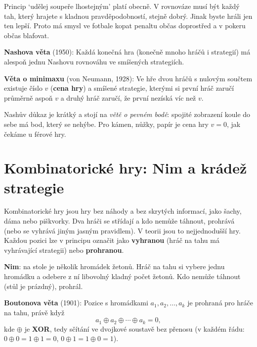 Princip `udělej soupeře lhostejným' platí obecně. V rovnováze musí být každý tah, který hrajete s kladnou pravděpodobností, stejně dobrý. Jinak byste hráli jen ten lepší. Proto má smysl ve fotbale kopat penaltu občas doprostřed a v pokeru občas blafovat.

\begin{definitionbox}
  \textbf{Nashova věta} (1950): Každá konečná hra (konečně mnoho hráčů i strategií) má alespoň jednu Nashovu rovnováhu ve smíšených strategiích.

  \textbf{Věta o minimaxu} (von Neumann, 1928): Ve hře dvou hráčů s nulovým součtem existuje číslo $v$ (\textbf{cena hry}) a smíšené strategie, kterými si první hráč zaručí průměrně aspoň $v$ a druhý hráč zaručí, že první nezíská víc než $v$.
\end{definitionbox}

Nashův důkaz je krátký a stojí na \textit{větě o pevném bodě}: spojité zobrazení koule do sebe má bod, který se nehýbe. Pro kámen, nůžky, papír je cena hry $v = 0$, jak čekáme u férové hry.

\section{Kombinatorické hry: Nim a krádež strategie}

Kombinatorické hry jsou hry bez náhody a bez skrytých informací, jako šachy, dáma nebo piškvorky. Dva hráči se střídají a kdo nemůže táhnout, prohrává (nebo se vyhrává jiným jasným pravidlem). V teorii jsou to nejjednodušší hry. Každou pozici lze v principu označit jako \textbf{vyhranou} (hráč na tahu má vyhrávající strategii) nebo \textbf{prohranou}.

\begin{definitionbox}
  \textbf{Nim}: na stole je několik hromádek žetonů. Hráč na tahu si vybere jednu hromádku a odebere z ní libovolný kladný počet žetonů. Kdo nemůže táhnout (stůl je prázdný), prohrál.

  \textbf{Boutonova věta} (1901): Pozice s hromádkami $a_1, a_2, \dots, a_k$ je prohraná pro hráče na tahu, právě když
  \begin{equation*}
    a_1\oplus a_2\oplus\cdots\oplus a_k = 0,
  \end{equation*}
  kde $\oplus$ je \textbf{XOR}, tedy sčítání ve dvojkové soustavě bez přenosu (v každém řádu: $0\oplus 0 = 1\oplus 1 = 0$, $0\oplus 1 = 1\oplus 0 = 1$).
\end{definitionbox}

